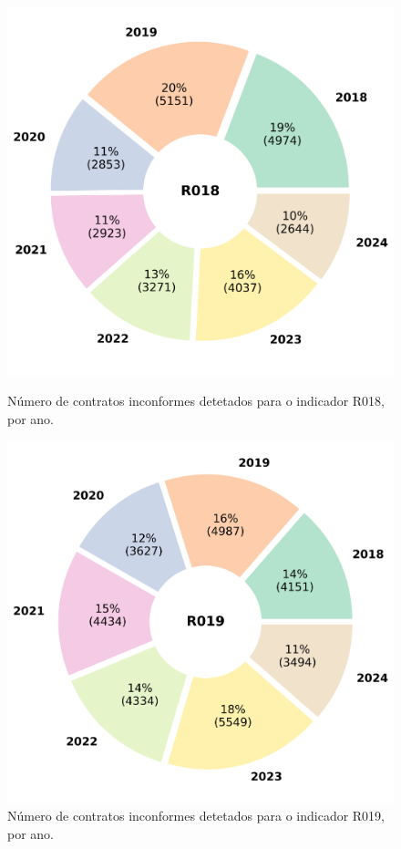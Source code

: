 \begin{figure}[H]
	\centering
	\begin{minipage}{.48\linewidth}
		\includegraphics[width=\linewidth]{imagens/final/circle_R018.png}
		\caption{Número de contratos inconformes detetados para o indicador R018, por ano.}
		\label{final4}
		
	\end{minipage}
	\hfill
	\begin{minipage}{.48\linewidth}
		\includegraphics[width=\linewidth]{imagens/final/circle_R019.png}
		\caption{Número de contratos inconformes detetados para o indicador R019, por ano.}
		\label{final5}
				
	\end{minipage}
\end{figure}




